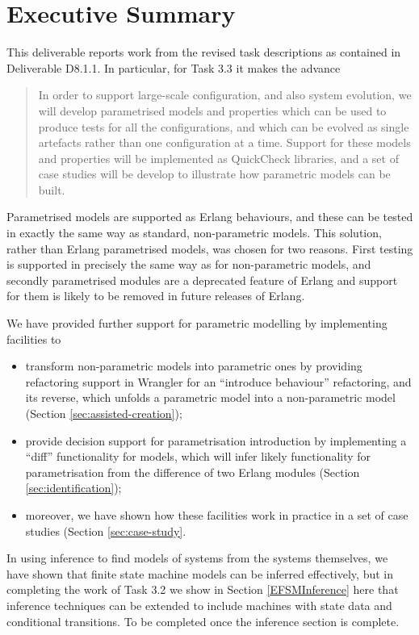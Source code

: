\section*{Executive Summary}

This deliverable reports work from the revised task descriptions as contained in Deliverable D8.1.1. In particular, for Task 3.3 it makes the advance
\begin{quote}
In order to support large-scale configuration, and also system evolution, we will develop parametrised models and properties which can be used to produce tests for all the configurations, and which can be evolved as single artefacts rather than one configuration at a time. Support for these models and properties will be implemented as QuickCheck libraries, and a set of case studies will be develop to illustrate how parametric models can be built.
\end{quote}
Parametrised models are supported as Erlang behaviours, and these can be tested in exactly the same way as standard, non-parametric models. This solution, rather than Erlang parametrised models, was chosen for two reasons. First testing is supported in precisely the same way as for non-parametric models, and secondly parametrised modules are a deprecated feature of Erlang and support for them is likely to be removed in future releases of Erlang.

We have provided further support for parametric modelling by implementing facilities to
\begin{itemize}
\item
transform non-parametric models into parametric ones by providing refactoring support in Wrangler for an ``introduce behaviour'' refactoring, and its reverse, which unfolds a parametric model into a non-parametric model (Section \ref{sec:assisted-creation});
\item
provide decision support for parametrisation introduction by implementing a ``diff'' functionality for models, which will infer likely functionality for parametrisation from the difference of two Erlang modules (Section \ref{sec:identification});
\item
moreover, we have shown how these facilities work in practice in a set of case studies (Section \ref{sec:case-study}.
\end{itemize}


In using inference to find models of systems from the systems themselves, we have shown that finite state machine models can be inferred effectively, but in completing the work of Task 3.2 we show in Section \ref{EFSMInference} here that inference techniques can be extended to include machines with state data and conditional transitions. {\color{red} To be completed once the inference section is complete.}




\clearpage
